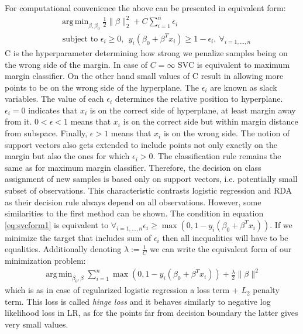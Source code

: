 \documentclass[12pt, wide]{mwart}
\DeclareMathOperator*{\argmin}{arg\,min}
\begin{document}
For computational convenience the above can be presented in equivalent form:
\begin{align}
& \argmin_{\beta, \beta_0} \frac{1}{2}\|\beta\|^2_2 + C \sum_{i=1}^n \epsilon_i \nonumber \\ &{\text { subject to }}\epsilon_i \geq 0, \ \  y_{i}\left(\beta_{0}+\beta^T x_i\right) \geq 1 - \epsilon_i, \ \forall_{i=1, \ldots, n} \label{eq:svcform1}
\end{align}
C is the hyperparameter determining how strong we penalize samples being on the wrong side of the margin. In case of $C = \infty$ SVC is equivalent to maximum margin classifier. On the other hand small values of C result in allowing more points to be on the wrong side of the hyperplane. The $\epsilon_i$ are known as slack variables. The value of each $\epsilon_i$ determines the relative position to hyperplane. $\epsilon_i=0$ indicates that $x_i$ is on the correct side of hyperplane, at least margin away from it. $0< \epsilon < 1$ means that $x_i$ is on the correct side but within margin distance from subspace. Finally, $\epsilon > 1$ means that $x_i$ is on the wrong side. The notion of support vectors also gets extended to include points not only exactly on the margin but also the ones for which $\epsilon_i > 0$. The classification rule remains the same as for maximum margin classifier. Therefore, the decision on class assignment of new samples is based only on support vectors, i.e. potentially small subset of observations. This characteristic contrasts logistic regression and RDA as their decision rule always depend on all observations. However, some similarities to the first method can be shown. The condition in equation \ref{eq:svcform1} is equivalent to $\forall_{i=1, \ldots, n} \epsilon_i \geq \max \left(0, 1 - y_i(\beta_0 + \beta^Tx_i) \right)$. If we minimize the target that includes sum of $\epsilon_i$ then all inequalities will have to be equalities. Additionally denoting $\lambda := \frac{1}{C}$ we can write the equivalent form of our minimization problem:
\begin{align*}
    \argmin_{\beta_0, \beta} \sum_{i=1}^n \max \left(0, 1 - y_i(\beta_0 + \beta^Tx_i)\right) + \frac{\lambda}{2} \|\beta\|^2
\end{align*}
which is as in case of regularized logistic regression a loss term + $L_2$ penalty term. This loss is called \textit{hinge loss} and it behaves similarly to negative log likelihood loss in LR, as for the points far from decision boundary the latter gives very small values.
\end{document}
